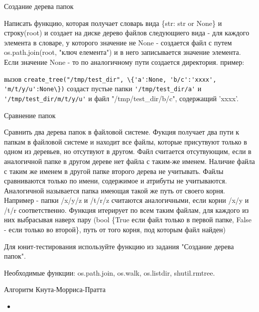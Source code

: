 \documentclass{article}
\begin{document}
\begin{center} Создание дерева папок \end{center}
Написать функцию, которая получает словарь вида 
\{str: str or None\} и строку(root) и создает на диске дерево файлов следующиего вида - 
для каждого элемента в словаре, у которого значение не None - создается файл 
с путем os.path.join(root, "ключ елемента") и в него записывается значение элемента.
Если значение None - то по аналогичному пути создается директория.
пример:

вызов \lstinline!create_tree("/tmp/test_dir", \{'a':None, 'b/c':'xxxx', 'm/t/y/u':None\})!
создаст пустые папки \lstinline!'/tmp/test_dir/a'! и \lstinline!'/tmp/test_dir/m/t/y/u'!
и файл "/tmp/test\_dir/b/c", содержащий 'xxxx'.

\newpage

\begin{center} Сравнение папок \end{center}
Сравнить два дерева папок в файловой системе. Фукция получает два пути к 
папкам в файловой системе и находит все файлы, которые присутвуют только в 
одном из деревьев, но отсутвуют в другом. Файл считается отсутвующим, если 
в аналогичной папке в другом дереве нет файла с таким-же именем. Наличие файла 
с таким же именем в другой папке второго дерева не учитывать. Файлы сравниваются
только по имени, содержимое и атрибуты не учитываются. Аналогичной называется 
папка имеющая такой же путь от своего корня. Например - папки
/x/y/z и /t/r/z считаются аналогичными, если корни /x/y и /t/r соответственно.
Функция итерирует по всем таким файлам, для каждого из них выбрасывая наверх
пару (bool \{True если файл только в первой папке, False - если только во второй\},
 путь от того корня, под которым файл найден)

Для юнит-тестирования используйте функцию из задания "Создание дерева папок".

Необходимые функции: os.path.join, os.walk, os.listdir, shutil.rmtree.
\newpage

\begin{center} Алгоритм Кнута-Морриса-Пратта \end{center}
\begin{itemize}
    \item 
\end{itemize}
\newpage
\end{document}
